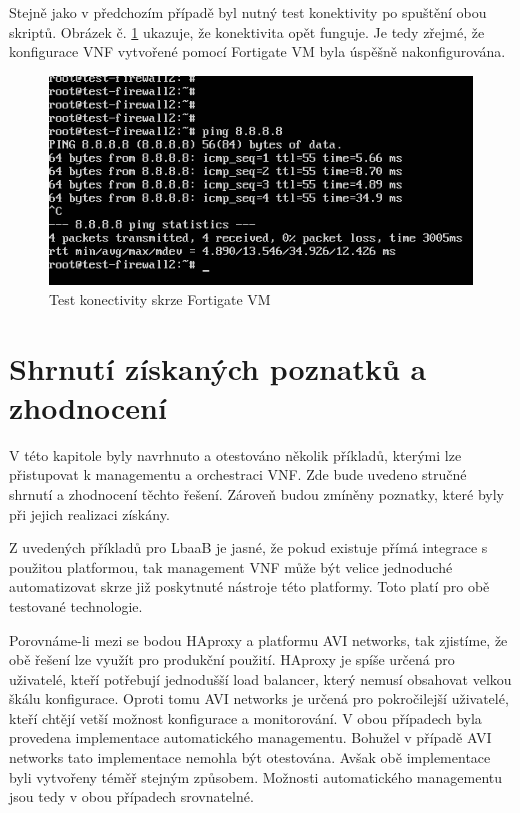 Stejně jako v předchozím případě byl nutný test konektivity po spuštění obou skriptů. Obrázek č. \ref{fig:test_fortios} ukazuje, že konektivita opět funguje. Je tedy zřejmé, že konfigurace VNF vytvořené pomocí Fortigate VM byla úspěšně nakonfigurována.

\begin{figure}[h]
\begin{centering}
\includegraphics[scale=0.5]{images/test_fortios}
\par\end{centering}
\caption{Test konectivity skrze Fortigate VM\label{fig:test_fortios}}
\end{figure}

\section{Shrnutí získaných poznatků a zhodnocení}

V této kapitole byly navrhnuto a otestováno několik příkladů, kterými lze přistupovat k managementu a orchestraci VNF. Zde bude uvedeno stručné shrnutí a zhodnocení těchto řešení. Zároveň budou zmíněny poznatky, které byly při jejich realizaci získány.

Z uvedených příkladů pro LbaaB je jasné, že pokud existuje přímá integrace s použitou platformou, tak management VNF může být velice jednoduché automatizovat skrze již poskytnuté nástroje této platformy. Toto platí pro obě testované technologie.

Porovnáme-li mezi se bodou HAproxy a platformu AVI networks, tak zjistíme, že obě řešení lze využít pro produkční použití. HAproxy je spíše určená pro uživatelé, kteří potřebují jednodušší load balancer, který nemusí obsahovat velkou škálu konfigurace. Oproti tomu AVI networks je určená pro pokročilejší uživatelé, kteří chtějí vetší možnost konfigurace a monitorování. V obou případech byla provedena implementace automatického managementu. Bohužel v případě AVI networks tato implementace nemohla být otestována. Avšak obě implementace byli vytvořeny téměř stejným způsobem. Možnosti automatického managementu jsou tedy v obou případech srovnatelné.

